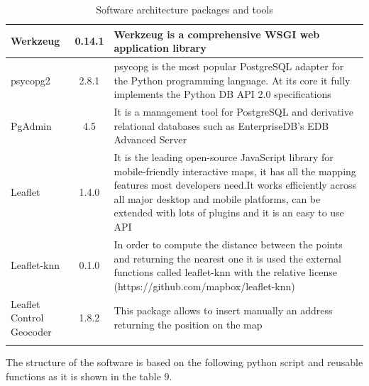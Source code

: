 \documentclass{article}
\begin{document}
\begin{longtable}[H]{|p{}|c|p{}|}
    \hline
    Werkzeug & 0.14.1 & Werkzeug is a comprehensive WSGI web application library
    \\
    \hline
    psycopg2 & 2.8.1 & psycopg is the most popular PostgreSQL adapter for the Python programming language. At its core it fully implements the Python DB API 2.0 specifications
    \\
    \hline
    PgAdmin & 4.5 & It is a management tool for PostgreSQL and derivative relational databases such as EnterpriseDB's EDB Advanced Server
        \\
    \hline
    Leaflet & 1.4.0 & It is the leading open-source JavaScript library for mobile-friendly interactive maps, it has all the mapping features most developers need.It works efficiently across all major desktop and mobile platforms, can be extended with lots of plugins and it is an easy to use  API 
       \\
    \hline
    Leaflet-knn & 0.1.0 & In order to compute the distance between the points and returning the nearest one it is used the external functions called leaflet-knn with the relative license (https://github.com/mapbox/leaflet-knn)
    \\
    \hline
    Leaflet Control Geocoder & 1.8.2 & This package allows to insert manually an address returning the position on the map\\
    \hline
\caption{Software architecture packages and tools}
\end{longtable}

The structure of the software is based on the following python script and reusable functions as it is shown in the table 9.
\newpage
\end{document}
